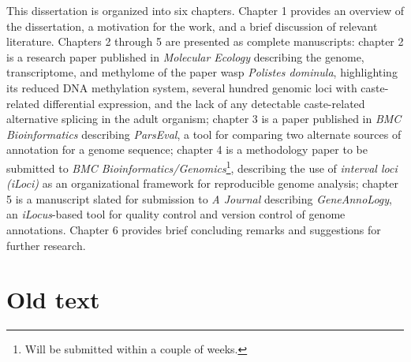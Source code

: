 This dissertation is organized into six chapters.
Chapter 1 provides an overview of the dissertation, a motivation for the work, and a brief discussion of relevant literature.
Chapters 2 through 5 are presented as complete manuscripts:
chapter 2 is a research paper published in \textit{Molecular Ecology} describing the genome, transcriptome, and methylome of the paper wasp \textit{Polistes dominula}, highlighting its reduced DNA methylation system, several hundred genomic loci with caste-related differential expression, and the lack of any detectable caste-related alternative splicing in the adult organism;
chapter 3 is a paper published in \textit{BMC Bioinformatics} describing \textit{ParsEval}, a tool for comparing two alternate sources of annotation for a genome sequence;
chapter 4 is a methodology paper to be submitted to \textit{BMC Bioinformatics/Genomics}\footnote{Will be submitted within a couple of weeks.}, describing the use of \textit{interval loci (iLoci)} as an organizational framework for reproducible genome analysis;
chapter 5 is a manuscript slated for submission to \textit{A Journal} describing \textit{GeneAnnoLogy}, an \textit{iLocus}-based tool for quality control and version control of genome annotations.
Chapter 6 provides brief concluding remarks and suggestions for further research.


\section{Old text}

